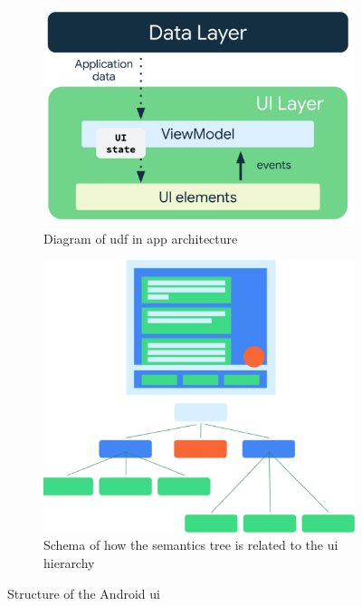 \begin{figure}[htbp!]
    \centering
    \begin{subfigure}[b]{0.5\textwidth}
        \centering
        \includegraphics[width=\textwidth]{graphics/android_udf}
        \caption{Diagram of \gls{udf} in app architecture \cite{android_ui_layer}}
        \label{fig:android_udf}
    \end{subfigure}
    \hfill
    \begin{subfigure}[b]{0.4\textwidth}
        \centering
        \includegraphics[width=\textwidth]{graphics/android_semantics-ui-tree}
        \caption{Schema of how the semantics tree is related to the \gls{ui} hierarchy \cite{android_semantics_compose}}
        \label{fig:android_semantics_ui_tree}
    \end{subfigure}
    \caption[Structure of the Android UI]{Structure of the Android \gls{ui}}
    \label{fig:android_tree}
\end{figure}

